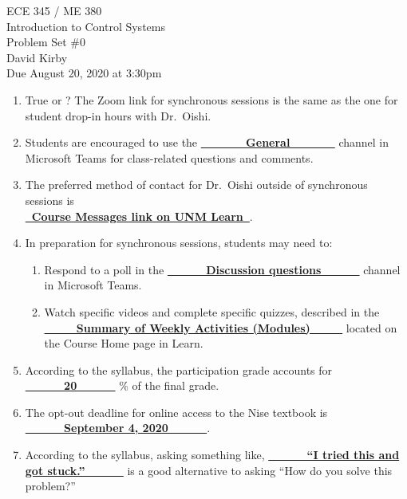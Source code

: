 \documentclass[11pt]{article}
\begin{document}
 	\begin{center}
 	\LARGE{ECE 345 / ME 380\\Introduction to Control Systems\\Problem Set \#0}\\[1.5em]
 	\large David Kirby\\[1.5em]
 	\large Due August 20, 2020 at 3:30pm\\[2.5em]
 	\end{center}

\begin{enumerate}
    \item True or ? The Zoom link for synchronous sessions is the same as the one for student drop-in hours with Dr.\ Oishi.
    \item Students are encouraged to use the \underline{\bfseries{\ \ \ \ \ \ \ General\ \ \ \ \ \ \ }} channel in Microsoft Teams for class-related questions and comments.
    \item The preferred method of contact for Dr.\ Oishi outside of synchronous sessions is\\[1em] \underline{\bfseries{\ Course Messages link on UNM Learn\ }}.
    \item In preparation for synchronous sessions, students may need to:
    \begin{enumerate}
        \item Respond to a poll in the \underline{\bfseries{\ \ \ \ \ \ Discussion questions\ \ \ \ \ \ }} channel in Microsoft Teams.
        \item Watch specific videos and complete specific quizzes, described in the\\ \underline{\bfseries{\ \ \ \ \ Summary of Weekly Activities (Modules)\ \ \ \ \ }} located on the Course Home page in Learn.
    \end{enumerate}
    \item According to the syllabus, the participation grade accounts for \underline{\bfseries{\ \ \ \ \ \ 20\ \ \ \ \ \ }} \% of the final grade.
    \item The opt-out deadline for online access to the Nise textbook is \underline{\bfseries{\ \ \ \ \ \ September 4, 2020\ \ \ \ \ \ }}.
    \item According to the syllabus, asking something like, \underline{\bfseries{\ \ \ \ \ \ ``I tried this and got stuck.''\ \ \ \ \ \ }} is a good alternative to asking ``How do you solve this problem?''
\end{enumerate}
\end{document}
